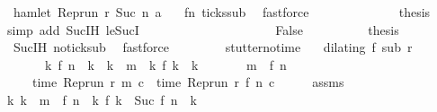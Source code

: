 \begin{isabellebody}
\ {\isacartoucheopen}{\isasymnot}\ hamlet\ {\isacharparenleft}{\isacharparenleft}Rep{\isacharunderscore}run\ r{\isacharparenright}\ {\isacharparenleft}Suc\ n{\isacharprime}{\isacharparenright}\ a{\isacharparenright}{\isacartoucheclose}\ \isamarkupfalse%
\ {\isacharasterisk}\ fn{}\ ticks{\isacharunderscore}sub\ \isamarkupfalse%
\ fastforce\isanewline
\ \ \ \ \ \ \ \ \ \ \ \ \isamarkupfalse%
\ {\isacharquery}thesis\ \isamarkupfalse%
\ {\isacharparenleft}simp\ add{\isacharcolon}\ Suc{\isachardot}IH\ le{\isacharunderscore}SucI{\isacharparenright}\isanewline
\ \ \ \ \ \ \ \ \isamarkupfalse%
\isanewline
\ \ \ \ \isamarkupfalse%
\isanewline
\ \ \ \ \ \ \isamarkupfalse%
\ False\isanewline
\ \ \ \ \ \ \ \ \isamarkupfalse%
\ {\isacharquery}thesis\ \ \isamarkupfalse%
\ {\isacharasterisk}\ Suc{\isachardot}IH\ no{\isacharunderscore}tick{\isacharunderscore}sub\ \isamarkupfalse%
\ fastforce\isanewline
\ \ \ \ \isamarkupfalse%
\isanewline
\ \ \isamarkupfalse%
\isanewline
{}\isamarkupfalse%
%
\endisatagproof
{\isafoldproof}%
%
\isadelimproof
\isanewline
%
\endisadelimproof
\isanewline
{}\isamarkupfalse%
\ stutter{\isacharunderscore}no{\isacharunderscore}time{\isacharcolon}\isanewline
\ \ \ {\isacartoucheopen}dilating\ f\ sub\ r{\isacartoucheclose}\isanewline
\ \ \ \ \ \ \ {\isacartoucheopen}{\isasymAnd}k{\isachardot}\ f\ n\ {\isacharless}\ k\ {\isasymand}\ k\ {\isasymle}\ m\ {\isasymLongrightarrow}\ {\isacharparenleft}{\isasymnexists}k\ f\ k\ {\isacharequal}\ k{\isacharparenright}{\isacartoucheclose}\isanewline
\ \ \ \ \ \ \ {\isacartoucheopen}m\ {\isachargreater}\ f\ n{\isacartoucheclose}\isanewline
\ \ \ \ \ {\isacartoucheopen}time\ {\isacharparenleft}{\isacharparenleft}Rep{\isacharunderscore}run\ r{\isacharparenright}\ m\ c{\isacharparenright}\ {\isacharequal}\ time\ {\isacharparenleft}{\isacharparenleft}Rep{\isacharunderscore}run\ r{\isacharparenright}\ {\isacharparenleft}f\ n{\isacharparenright}\ c{\isacharparenright}{\isacartoucheclose}\isanewline
%
\isadelimproof
%
\endisadelimproof
%
\isatagproof
{}\isamarkupfalse%
\ {\isacharminus}\isanewline
\ \ \isamarkupfalse%
\ assms\ \isamarkupfalse%
\ {\isacartoucheopen}{\isasymforall}k{\isachardot}\ k\ {\isacharless}\ m\ {\isacharminus}\ {\isacharparenleft}f\ n{\isacharparenright}\ {\isasymlongrightarrow}\ {\isacharparenleft}{\isasymnexists}k\ f\ k\ {\isacharequal}\ Suc\ {\isacharparenleft}{\isacharparenleft}f\ n{\isacharparenright}\ {\isacharplus}\ k{\isacharparenright}{\isacharparenright}{\isacartoucheclose}\ \isamarkupfalse%

\end{isabellebody}
